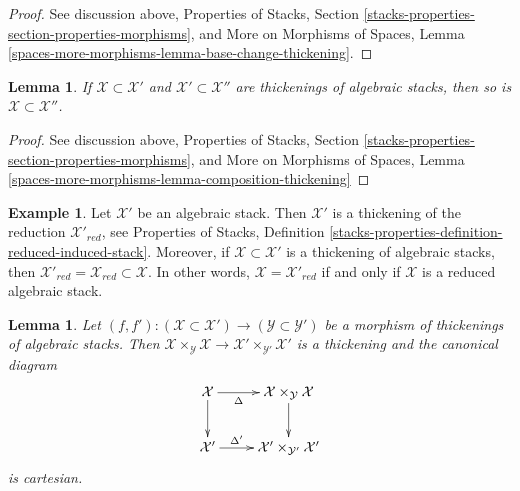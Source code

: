 \documentclass{stacks-project}
\theoremstyle{plain}
\newtheorem{lemma}[subsection]{Lemma}
\theoremstyle{definition}
\newtheorem{example}[subsection]{Example}
\theoremstyle{remark}
\numberwithin{equation}{subsection}
\begin{document}
\begin{proof}
See discussion above, Properties of Stacks, Section
\ref{stacks-properties-section-properties-morphisms}, and
More on Morphisms of Spaces, Lemma
\ref{spaces-more-morphisms-lemma-base-change-thickening}.
\end{proof}

\begin{lemma}
\label{lemma-composition-thickening}
If $\mathcal{X} \subset \mathcal{X}'$ and $\mathcal{X}' \subset \mathcal{X}''$
are thickenings of algebraic stacks, then so is
$\mathcal{X} \subset \mathcal{X}''$.
\end{lemma}

\begin{proof}
See discussion above, Properties of Stacks, Section
\ref{stacks-properties-section-properties-morphisms}, and
More on Morphisms of Spaces, Lemma
\ref{spaces-more-morphisms-lemma-composition-thickening}
\end{proof}

\begin{example}
\label{example-reduction-thickening}
Let $\mathcal{X}'$ be an algebraic stack. Then $\mathcal{X}'$ is a thickening
of the reduction $\mathcal{X}'_{red}$, see
Properties of Stacks, Definition
\ref{stacks-properties-definition-reduced-induced-stack}.
Moreover, if $\mathcal{X} \subset \mathcal{X}'$ is a thickening
of algebraic stacks, then
$\mathcal{X}'_{red} = \mathcal{X}_{red} \subset \mathcal{X}$.
In other words, $\mathcal{X} = \mathcal{X}'_{red}$ if and only
if $\mathcal{X}$ is a reduced algebraic stack.
\end{example}

\begin{lemma}
\label{lemma-reduced-diagonal}
Let $(f, f') : (\mathcal{X} \subset \mathcal{X}') \to
(\mathcal{Y} \subset \mathcal{Y}')$ be a morphism of thickenings
of algebraic stacks. Then
$\mathcal{X} \times_\mathcal{Y} \mathcal{X} \to
\mathcal{X}' \times_{\mathcal{Y}'} \mathcal{X}'$
is a thickening and the canonical diagram
$$
\xymatrix{
\mathcal{X} \ar[r]_-\Delta \ar[d] &
\mathcal{X} \times_\mathcal{Y} \mathcal{X} \ar[d] \\
\mathcal{X}' \ar[r]^-{\Delta'} &
\mathcal{X}' \times_{\mathcal{Y}'} \mathcal{X}'
}
$$
is cartesian.
\end{lemma}
\end{document}
